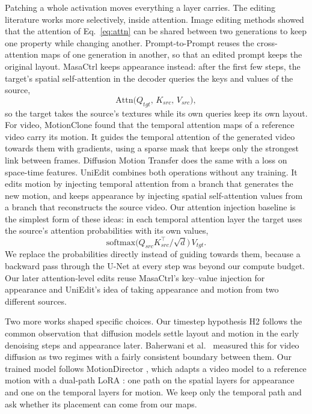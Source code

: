 \documentclass[twoside,english]{article}
\begin{document}
Patching a whole activation moves everything a layer carries. The editing literature works more
selectively, inside attention. Image editing methods showed that the attention of Eq.~\eqref{eq:attn}
can be shared between two generations to keep one property while changing another. Prompt-to-Prompt
\citep{hertz2023p2p} reuses the cross-attention maps of one generation in another, so that an edited
prompt keeps the original layout. MasaCtrl \citep{cao2023masactrl} keeps appearance instead: after the
first few steps, the target's spatial self-attention in the decoder queries the keys and values of the
source,
\begin{equation}
\mathrm{Attn}\big(Q_{tgt},\, K_{src},\, V_{src}\big), \label{eq:masactrl}
\end{equation}
so the target takes the source's textures while its own queries keep its own layout. For video,
MotionClone \citep{ling2025motionclone} found that the temporal attention maps of a reference video
carry its motion. It guides the temporal attention of the generated video towards them with
gradients, using a sparse mask that keeps only the strongest link between frames. Diffusion Motion
Transfer \citep{yatim2024dmt} does the same with a loss on space-time features. UniEdit
\citep{bai2024uniedit} combines both operations without any training. It edits motion by injecting
temporal attention from a branch that generates the new motion, and keeps appearance by injecting
spatial self-attention values from a branch that reconstructs the source video. Our attention
injection baseline is the simplest form of these ideas: in each temporal attention layer the target
uses the source's attention probabilities with its own values,
\begin{equation}
\mathrm{softmax}\big(Q_{src}K_{src}^\top/\sqrt{d}\big)\,V_{tgt}. \label{eq:attn_inject}
\end{equation}
We replace the probabilities directly instead of guiding towards them, because a backward pass
through the U-Net at every step was beyond our compute budget. Our later attention-level edits reuse
MasaCtrl's key--value injection for appearance and UniEdit's idea of taking appearance and motion from
two different sources.

Two more works shaped specific choices. Our timestep hypothesis H2 follows the common observation
that diffusion models settle layout and motion in the early denoising steps and appearance later.
Baherwani et al.\ \citep{baherwani2025timesteps} measured this for video diffusion as two regimes with
a fairly consistent boundary between them. Our trained model follows MotionDirector
\citep{zhao2024motiondirector}, which adapts a video model to a reference motion with a dual-path LoRA
\citep{hu2022lora}: one path on the spatial layers for appearance and one on the temporal layers for
motion. We keep only the temporal path and ask whether its placement can come from our maps.
\end{document}
